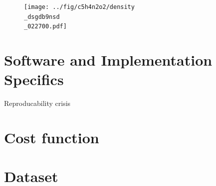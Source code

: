 \begin{figure}[H]
    \centering
    \texttt{[image: ../fig/c5h4n2o2/density\\\_dsgdb9nsd\\\_022700.pdf]}
    \caption[Density matrix of dsgdb9nsd\_022700 in the sto-3g basis with theory level B3LYP]{\TODO{}}
    \label{fig:density_dsgdb9nsd_022700}
\end{figure}

\section{Software and Implementation Specifics}
\label{sec:software_and_implementation}
Reproducability crisis
\section{Cost function}
\section{Dataset}